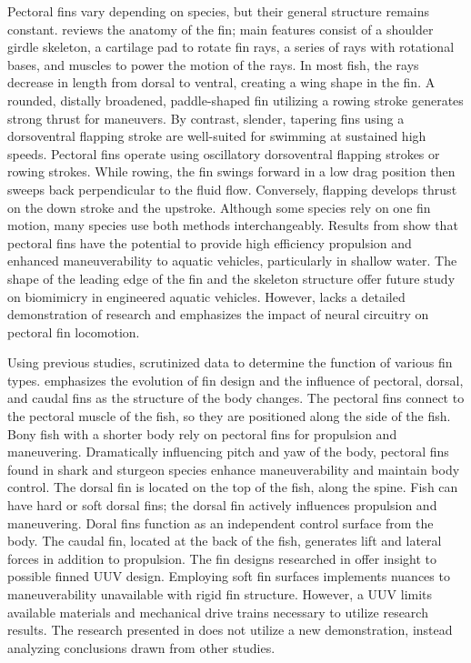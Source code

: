 \documentclass{IEEEtran}
\begin{document}
Pectoral fins vary depending on species, but their general structure remains constant.  \cite{westneat2004structure} reviews the anatomy of the fin; main features consist of a shoulder girdle skeleton, a cartilage pad to rotate fin rays, a series of rays with rotational bases, and muscles to power the motion of the rays.   In most fish, the rays decrease in length from dorsal to ventral, creating a wing shape in the fin.  A rounded, distally broadened, paddle-shaped fin utilizing a rowing stroke generates strong thrust for maneuvers.  By contrast, slender, tapering fins using a dorsoventral flapping stroke are well-suited for swimming at sustained high speeds.  Pectoral fins operate using oscillatory dorsoventral flapping strokes or rowing strokes. While rowing, the fin swings forward in a low drag position then sweeps back perpendicular to the fluid flow.  Conversely, flapping develops thrust on the down stroke and the upstroke.  Although some species rely on one fin motion, many species use both methods interchangeably.  Results from \cite{westneat2004structure} show that pectoral fins have the potential to provide high efficiency propulsion and enhanced maneuverability to aquatic vehicles, particularly in shallow water.  The shape of the leading edge of the fin and the skeleton structure offer future study on biomimicry in engineered aquatic vehicles.  However, \cite{westneat2004structure} lacks a detailed demonstration of research and emphasizes the impact of neural circuitry on pectoral fin locomotion.  

Using previous studies, \cite{lauder2004morphology} scrutinized data to determine the function of various fin types.  \cite{lauder2004morphology} emphasizes the evolution of fin design and the influence of pectoral, dorsal, and caudal fins as the structure of the body changes.  The pectoral fins connect to the pectoral muscle of the fish, so they are positioned along the side of the fish.  Bony fish with a shorter body rely on pectoral fins for propulsion and maneuvering.  Dramatically influencing pitch and yaw of the body, pectoral fins found in shark and sturgeon species enhance maneuverability and maintain body control.  The dorsal fin is located on the top of the fish, along the spine.  Fish can have hard or soft dorsal fins; the dorsal fin actively influences propulsion and maneuvering.  Doral fins function as an independent control surface from the body.  The caudal fin, located at the back of the fish, generates lift and lateral forces in addition to propulsion.  The fin designs researched in \cite{lauder2004morphology} offer insight to possible finned UUV design.  Employing soft fin surfaces implements nuances to maneuverability unavailable with rigid fin structure.  However, a UUV limits available materials and mechanical drive trains necessary to utilize research results.  The research presented in \cite{lauder2004morphology} does not utilize a new demonstration, instead analyzing conclusions drawn from other studies.  
\end{document}
